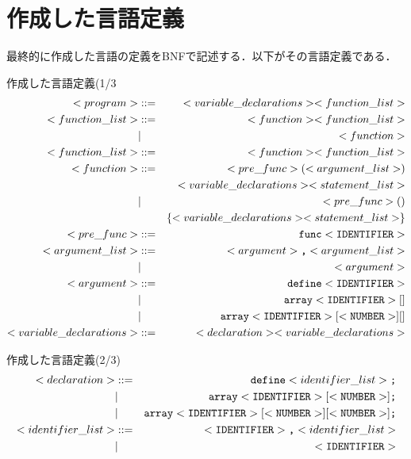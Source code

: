 \documentclass[a4paper,11pt]{jarticle}
\begin{document}
\section{作成した言語定義}
最終的に作成した言語の定義をBNFで記述する．以下がその言語定義である．
{\fontsize{10pt}{11pt} \selectfont
\begin{itembox}[l]{作成した言語定義(1/3}
\begin{eqnarray*}
  <program> &::=& <variable\_declarations> <function\_list> \\
  <function\_list> &::=& <function> <function\_list> \\
    &|& <function> \\
  <function\_list> &::=& <function> <function\_list> \\
  <function> &::=& <pre\_func> (<argument\_list>) \\&&{<variable\_declarations> <statement\_list>} \\
  &|& <pre\_func> () \\&& \{ <variable\_declarations>  <statement\_list> \} \\
<pre\_func> &::=& \verb|func| <\verb|IDENTIFIER|> \\
<argument\_list> &::=& <argument>\verb|,| <argument\_list> \\
                  &|& <argument>\\
<argument> &::=& \verb|define| <\verb|IDENTIFIER|>\\
             &|& \verb|array| <\verb|IDENTIFIER|>[] \\
             &|& \verb|array| <\verb|IDENTIFIER|> [<\verb|NUMBER|>][] \\
<variable\_declarations> &::=& <declaration> <variable\_declarations>  \\
\end{eqnarray*}
\end{itembox}
\begin{itembox}[l]{作成した言語定義(2/3)}
\begin{eqnarray*}
<declaration> &::=& \verb|define| <identifier\_list>\verb|;|    \\
                &|& \verb|array| <\verb|IDENTIFIER|> [<\verb|NUMBER|>]\verb|;|  \\ 
                &|& \verb|array| <\verb|IDENTIFIER|> [<\verb|NUMBER|>][<\verb|NUMBER|>]\verb|;| \\
<identifier\_list> &::=& <\verb|IDENTIFIER|>\verb|,| <identifier\_list> \\
                    &|& <\verb|IDENTIFIER|>\\

\end{eqnarray*}
\end{itembox}}
\end{document}
